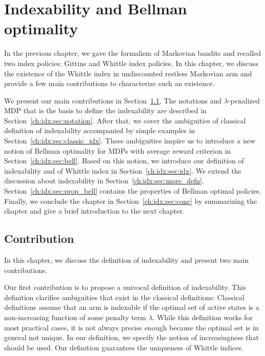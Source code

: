 \begingroup

\let\clearpage\relax

\chapter{Indexability and Bellman optimality}
\label{ch:indexability}

In the previous chapter, we gave the formalism of Markovian bandits and recalled two index policies: Gittins and Whittle index policies.
In this chapter, we discuss the existence of the Whittle index in undiscounted restless Markovian arm and provide a few main contributions to characterize such an existence.

We present our main contributions in Section~\ref{ch:idx:sec:contrib}. The notations and $\lambda$-penalized MDP that is the basis to define the indexability are described in Section~\ref{ch:idx:sec:notation}.
After that, we cover the ambiguities of classical definition of indexability accompanied by simple examples in Section~\ref{ch:idx:sec:classic_idx}.
These ambiguities inspire us to introduce a new notion of Bellman optimality for MDPs with average reward criterion in Section~\ref{ch:idx:sec:bell}.
Based on this notion, we introduce our definition of indexability and of Whittle index in Section~\ref{ch:idx:sec:idx}.
We extend the discussion about indexability in Section~\ref{ch:idx:sec:more_defn}.
Section~\ref{ch:idx:sec:prop_bell} contains the properties of Bellman optimal policies.
Finally, we conclude the chapter in Section~\ref{ch:idx:sec:conc} by summarizing the chapter and give a brief introduction to the next chapter.


\section{Contribution}
\label{ch:idx:sec:contrib}

In this chapter, we discuss the definition of indexability and present two main contributions.

Our first contribution is to propose a univocal definition of indexability. This definition clarifies ambiguities that exist in the classical definitions: Classical definitions assume that an arm is indexable if the optimal set of active states is a non-increasing function of some penalty term $\lambda$. While this definition works for most practical cases, it is not always precise enough because the optimal set is in general not unique. In our definition, we specify the notion of increasingness that should be used. Our definition guarantees the uniqueness of Whittle indices.

